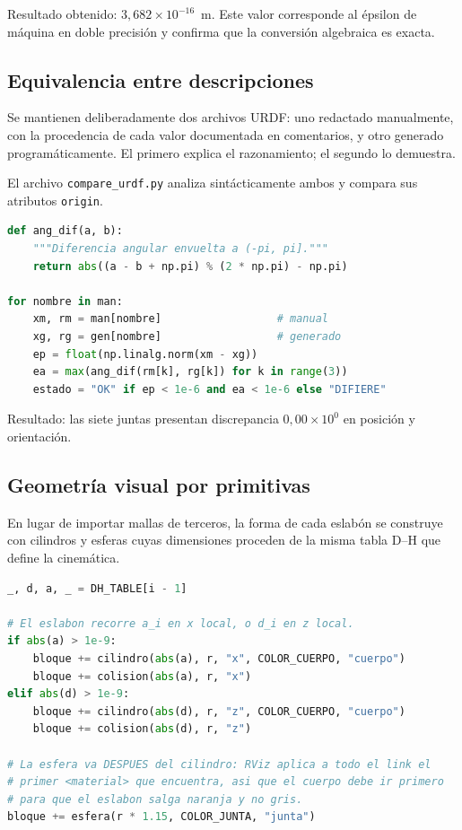 \documentclass[11pt,a4paper]{article}
\begin{document}
Resultado obtenido: $3{,}682\times10^{-16}$~m. Este valor corresponde al
épsilon de máquina en doble precisión y confirma que la conversión
algebraica es exacta.

\subsection{Equivalencia entre descripciones}

Se mantienen deliberadamente dos archivos URDF: uno redactado
manualmente, con la procedencia de cada valor documentada en
comentarios, y otro generado programáticamente. El primero explica el
razonamiento; el segundo lo demuestra.

El archivo \texttt{compare\_urdf.py} analiza sintácticamente ambos y
compara sus atributos \texttt{origin}.

\begin{lstlisting}[language=Python,caption={Comparación de las dos
descripciones}]
def ang_dif(a, b):
    """Diferencia angular envuelta a (-pi, pi]."""
    return abs((a - b + np.pi) % (2 * np.pi) - np.pi)

for nombre in man:
    xm, rm = man[nombre]                  # manual
    xg, rg = gen[nombre]                  # generado
    ep = float(np.linalg.norm(xm - xg))
    ea = max(ang_dif(rm[k], rg[k]) for k in range(3))
    estado = "OK" if ep < 1e-6 and ea < 1e-6 else "DIFIERE"
\end{lstlisting}

Resultado: las siete juntas presentan discrepancia $0{,}00\times10^{0}$
en posición y orientación.

\subsection{Geometría visual por primitivas}
\label{sec:visual}

En lugar de importar mallas de terceros, la forma de cada eslabón se
construye con cilindros y esferas cuyas dimensiones proceden de la misma
tabla D--H que define la cinemática.

\begin{lstlisting}[language=Python,caption={Dimensionado de la geometría
a partir de los parámetros D--H}]
_, d, a, _ = DH_TABLE[i - 1]

# El eslabon recorre a_i en x local, o d_i en z local.
if abs(a) > 1e-9:
    bloque += cilindro(abs(a), r, "x", COLOR_CUERPO, "cuerpo")
    bloque += colision(abs(a), r, "x")
elif abs(d) > 1e-9:
    bloque += cilindro(abs(d), r, "z", COLOR_CUERPO, "cuerpo")
    bloque += colision(abs(d), r, "z")

# La esfera va DESPUES del cilindro: RViz aplica a todo el link el
# primer <material> que encuentra, asi que el cuerpo debe ir primero
# para que el eslabon salga naranja y no gris.
bloque += esfera(r * 1.15, COLOR_JUNTA, "junta")
\end{lstlisting}
\end{document}
